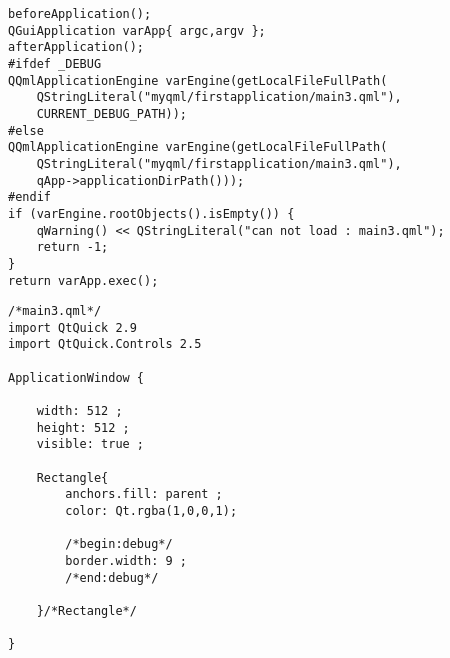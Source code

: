 \FloatBarrier
\begin{lstlisting}[label=f000022,
caption=GoodLuck,
title=\lstlistingname\ \thelstlisting
,firstnumber=111]
beforeApplication();
QGuiApplication varApp{ argc,argv };
afterApplication();
#ifdef _DEBUG
QQmlApplicationEngine varEngine(getLocalFileFullPath(
    QStringLiteral("myqml/firstapplication/main3.qml"),
    CURRENT_DEBUG_PATH));
#else
QQmlApplicationEngine varEngine(getLocalFileFullPath(
    QStringLiteral("myqml/firstapplication/main3.qml"),
    qApp->applicationDirPath()));
#endif
if (varEngine.rootObjects().isEmpty()) {
    qWarning() << QStringLiteral("can not load : main3.qml");
    return -1;
}
return varApp.exec();
\end{lstlisting}          %
\FloatBarrier
\begin{lstlisting}[label=f000025,
caption=GoodLuck,
title=\lstlistingname\ \thelstlisting
]
/*main3.qml*/
import QtQuick 2.9
import QtQuick.Controls 2.5

ApplicationWindow {

    width: 512 ;
    height: 512 ;
    visible: true ;

    Rectangle{
        anchors.fill: parent ;
        color: Qt.rgba(1,0,0,1);

        /*begin:debug*/
        border.width: 9 ;
        /*end:debug*/

    }/*Rectangle*/

}
\end{lstlisting}          %



































